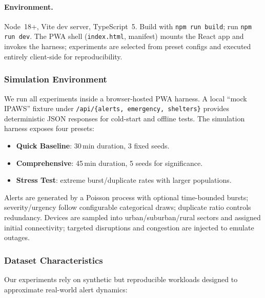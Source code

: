 \documentclass[11pt,twocolumn]{article}
\begin{document}
\paragraph{Environment.}
Node~18+, Vite dev server, TypeScript~5. Build with \texttt{npm run build}; run \texttt{npm run dev}. The PWA shell (\texttt{index.html}, manifest) mounts the React app and invokes the harness; experiments are selected from preset configs and executed entirely client-side for reproducibility.

\subsubsection{Simulation Environment}
We run all experiments inside a browser-hosted PWA harness. A local “mock IPAWS” fixture under \texttt{/api/\{alerts, emergency, shelters\}} provides deterministic JSON responses for cold-start and offline tests. The simulation harness exposes four presets:

\begin{itemize}
    \item \textbf{Quick Baseline}: 30\,min duration, 3 fixed seeds.
    \item \textbf{Comprehensive}: 45\,min duration, 5 seeds for significance.
    \item \textbf{Stress Test}: extreme burst/duplicate rates with larger populations.
\end{itemize}

Alerts are generated by a Poisson process with optional time-bounded bursts; severity/urgency follow configurable categorical draws; duplicate ratio controls redundancy. Devices are sampled into urban/suburban/rural sectors and assigned initial connectivity; targeted disruptions and congestion are injected to emulate outages.

\subsubsection{Dataset Characteristics}

Our experiments rely on synthetic but reproducible workloads designed to approximate real-world alert dynamics:
\end{document}
